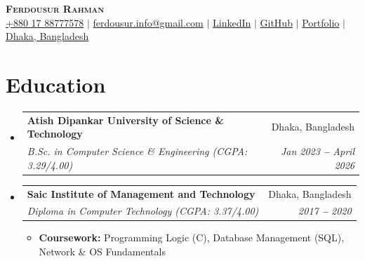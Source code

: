 \documentclass[letterpaper,11pt]{article}
\makeatletter
\newcommand{\resumeItem}[1]{
  \item\small{
    {#1 \vspace{-2pt}}
  }
}
\newcommand{\resumeSubheading}[4]{
  \vspace{-2pt}\item
    \begin{tabular*}{0.97\textwidth}[t]{l@{\extracolsep{\fill}}r}
      \textbf{#1} & #2 \\
      \textit{\small#3} & \textit{\small #4} \\
    \end{tabular*}\vspace{-7pt}
}
\newcommand{\resumeSubHeadingListStart}{\begin{itemize}[leftmargin=0.15in, label={}]}
\newcommand{\resumeSubHeadingListEnd}{\end{itemize}}
\newcommand{\resumeItemListStart}{\begin{itemize}}
\newcommand{\resumeItemListEnd}{\end{itemize}\vspace{-5pt}}
\makeatother
\begin{document}

\begin{center}
    \textbf{\Huge \scshape Ferdousur Rahman} \\ \vspace{3pt}
    \small
    \faMobile \hspace{.5pt} \href{tel:01788777578}{+880 17 88777578}
    $|$
    \faAt \hspace{.5pt} \href{mailto:ferdousur.info@gmail.com}{ferdousur.info@gmail.com}
    $|$
    \faLinkedinSquare \hspace{.5pt} \href{https://www.linkedin.com/in/ferdousur-rahman/}{LinkedIn}
    $|$
    \faGithub \hspace{.5pt} \href{https://github.com/ferdousur}{GitHub}
    $|$
    \faGlobe \hspace{.5pt} \href{https://ferdousur.github.io/my-portfolio/}{Portfolio}
    $|$
    \faMapMarker \hspace{.5pt} \href{https://maps.app.goo.gl/TPgB2mfBxcRXLp4D6}{Dhaka, Bangladesh}
\end{center}


\section{Education}
  \resumeSubHeadingListStart
    
    \resumeSubheading
      {Atish Dipankar University of Science \& Technology}{Dhaka, Bangladesh}
      {B.Sc. in Computer Science \& Engineering (CGPA: 3.29/4.00)}{Jan 2023 \textbf{--} April 2026}
    
    \resumeSubheading
      {Saic Institute of Management and Technology}{Dhaka, Bangladesh}
      {Diploma in Computer Technology (CGPA: 3.37/4.00)}{2017 \textbf{--} 2020}
      \resumeItemListStart
        \resumeItem{\textbf{Coursework:} Programming Logic (C), Database Management (SQL), Network \& OS Fundamentals}
      \resumeItemListEnd
    
  \resumeSubHeadingListEnd


\end{document}
